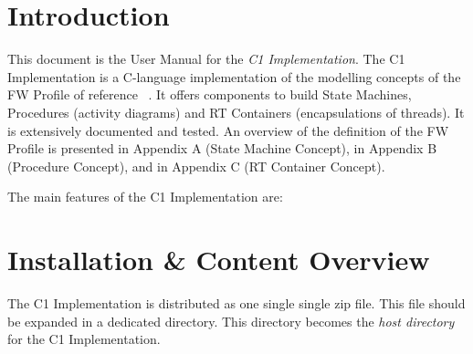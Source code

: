 \documentclass[manual]{../fwprofile}
\begin{document}
\fwmaketitle
\begin{abstract}
This document is the User Manual for the C1 Implementation of the FW Profile. The FW Profile is a specification-level modelling language defined as a restriction of UML. The core modelling constructs offered by the FW Profile are State Machines, Procedures (equivalent to UML's Activity Diagrams), and RT Containers (encapsulations of threads).
\par
The FW Profile is implementation-independent. The C1 Implementation is a C language implementation of the modelling concepts of the FW Profile. The main features of the C1 Implementation are: small memory footprint, small CPU demands, scalability, and
high reliability.
\par 
The C1 Implementation is provided with a Qualification Data Package which can be used to support the certification of applications built using its components.
\end{abstract}
\fwfrontmatter

\section{Introduction}
This document is the User Manual for the \emph{C1 Implementation}. 
The C1 Implementation is a C-language implementation of the modelling concepts of the FW Profile of reference ~\cite{ref:fwprofile}. It offers components to build State Machines, Procedures (activity diagrams) and RT Containers (encapsulations of threads). It is extensively documented and tested. An overview of the definition of the FW Profile is presented in Appendix A (State Machine Concept), in Appendix B (Procedure Concept), and in Appendix C (RT Container Concept).  

The main features of the C1 Implementation are:




\section{Installation \& Content Overview}
The C1 Implementation is distributed as one single single zip file. This file should be expanded in a dedicated directory. This directory becomes the \emph{host directory} for the C1 Implementation.
\end{document}
